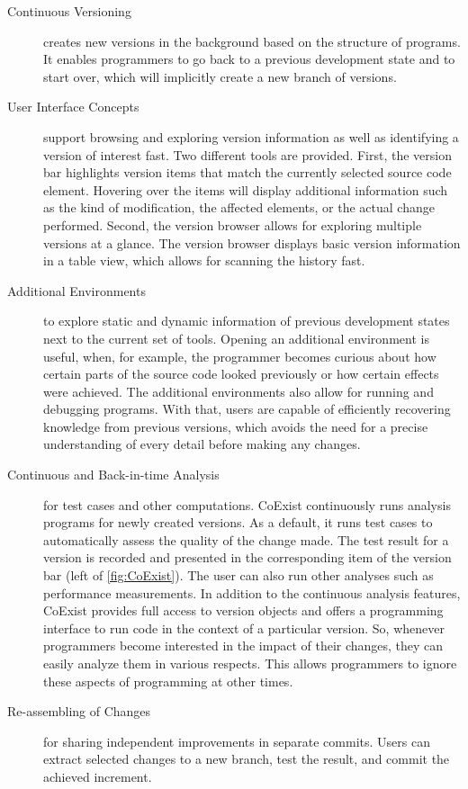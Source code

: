 \documentclass{sigplanconf}
\newcommand{\coexist}{CoExist\xspace}
\begin{document}
\begin{description}
\item[Continuous Versioning] creates new versions in the background
  based on the structure of programs. It enables programmers to go
  back to a previous development state and to start over, which will
  implicitly create a new branch of versions.
 
\item[User Interface Concepts] support browsing and exploring version
  information as well as identifying a version of interest fast. Two
  different tools are provided. First, the version bar highlights
  version items that match the currently selected source code
  element. Hovering over the items will display additional information such
  as the kind of modification, the affected elements, or the actual
  change performed. Second, the version browser allows for exploring
  multiple versions at a glance. The version browser displays basic
  version information in a table view, which allows for scanning the
  history fast.

\item[Additional Environments] to explore static and dynamic
  information of previous development states next to the current set
  of tools. Opening an additional environment is useful, when, for
  example, the programmer becomes curious about how certain
  parts of the source code looked previously or how certain effects
  were achieved. The additional environments also allow for running
  and debugging programs. With that, users are capable of efficiently
  recovering knowledge from previous versions, which avoids the need
  for a precise understanding of every detail before making any
  changes.

\item[Continuous and Back-in-time Analysis] for test cases and other
  computations. \coexist{} continuously runs analysis programs for
  newly created versions. As a default, it runs test cases to
  automatically assess the quality of the change made. The test result
  for a version is recorded and presented in the corresponding item
  of the version bar (left of \autoref{fig:CoExist}). The user can
  also run other analyses such as performance measurements. In
  addition to the continuous analysis features, \coexist provides full
  access to version objects and offers a programming interface to run
  code in the context of a particular version. So, whenever
  programmers become interested in the impact of their changes, they
  can easily analyze them in various respects. This allows programmers
  to ignore these aspects of programming at other times.

\item[Re-assembling of Changes] for sharing independent improvements
  in separate commits. Users can extract selected changes to a new
  branch, test the result, and commit the achieved increment.
\end{description}
\end{document}
